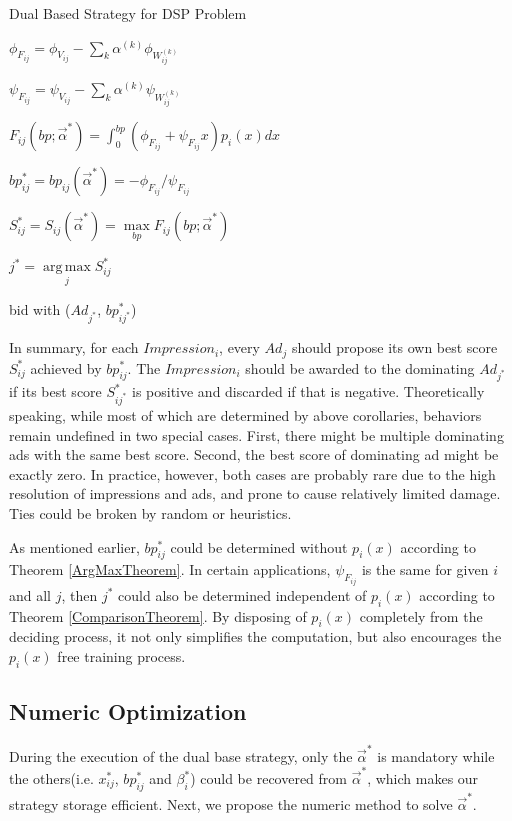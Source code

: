 \documentclass{article}
\DeclareMathOperator*{\argmax}{arg\,max}
\newcommand{\sx}{x_{ij}}
\newcommand{\sbp}{bp_{ij}}
\newcommand{\sV}{V_{ij}}
\newcommand{\sW}{W_{ij}^{(k)}}
\newcommand{\salpha}{\alpha^{(k)}}
\newcommand{\sbeta}{\beta_i}
\newcommand{\sF}{F_{ij}}
\newcommand{\sS}{S_{ij}}
\newcommand{\valpha}{\vec{\alpha}}
\newcommand{\pprob}{\phi}
\newcommand{\pcost}{\psi}
\begin{document}
\begin{algorithm}
\caption{Dual Based Strategy for DSP Problem \label{DSPAlgo}}

{
  {
    $\pprob_{\sF} = \pprob_{\sV} - \sum\limits_k \salpha \pprob_{\sW}$

    $\pcost_{\sF} = \pcost_{\sV} - \sum\limits_k \salpha \pcost_{\sW}$

    $\sF(bp; \valpha^*) = \int_0^{bp} (\pprob_{\sF}+\pcost_{\sF}x)p_i(x)dx$

    $\sbp^* = \sbp(\valpha^*) = -\pprob_{\sF} / \pcost_{\sF}$

    $\sS^* = \sS(\valpha^*) = \max\limits_{bp} \sF(bp; \valpha^*)$
  }
  $j^* = \argmax\limits_j \sS^*$
  
   { bid with ($Ad_{j^*}$, $bp_{ij^*}^*$) }
}
\end{algorithm}

In summary, for each $Impression_i$, every $Ad_j$ should propose its own best score $\sS^*$ achieved by $\sbp^*$.
The $Impression_i$ should be awarded to the dominating $Ad_{j^*}$ if its best score $S_{ij^*}^*$ is positive and discarded if that is negative.
Theoretically speaking, while most of which are determined by above corollaries, behaviors remain undefined in two special cases.
First, there might be multiple dominating ads with the same best score.
Second, the best score of dominating ad might be exactly zero.
In practice, however, both cases are probably rare due to the high resolution of impressions and ads, and prone to cause relatively limited damage.
Ties could be broken by random or heuristics.

As mentioned earlier, $\sbp^*$ could be determined without $p_i(x)$ according to Theorem \ref{ArgMaxTheorem}.
In certain applications, $\pcost_{\sF}$ is the same for given $i$ and all $j$,
    then $j^*$ could also be determined independent of $p_i(x)$ according to Theorem \ref{ComparisonTheorem}.
By disposing of $p_i(x)$ completely from the deciding process,
    it not only simplifies the computation, but also encourages the $p_i(x)$ free training process.

\subsection{Numeric Optimization} \label{DSPNumericOptimization}

During the execution of the dual base strategy,
    only the $\valpha^*$ is mandatory while the others(i.e. $\sx^*$, $\sbp^*$ and $\sbeta^*$) could be recovered from $\valpha^*$,
    which makes our strategy storage efficient.
Next, we propose the numeric method to solve $\valpha^*$.
\end{document}

